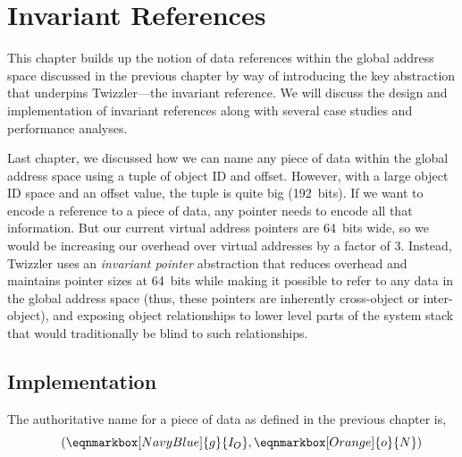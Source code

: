 
\chapter{Invariant References}\label{ch:invariant}


\begin{chabstract}
    This chapter builds up the notion of data references within the global address space discussed in the previous chapter by way of introducing the key abstraction that underpins
    Twizzler---the invariant reference. We will discuss the design and implementation of invariant references along with several case studies and performance analyses.
\end{chabstract}


Last chapter, we discussed how we can name any piece of data within the global address space using a tuple of object ID
and offset. However, with a large object ID space and an offset value, the tuple is quite big (192~bits). If we want to
encode a reference to a piece of data, any pointer needs to encode all that information. But our current virtual
address pointers are 64~bits wide, so we would be increasing our overhead over virtual addresses by a factor of 3.
Instead, Twizzler uses an \emph{invariant pointer} abstraction that reduces overhead and maintains pointer sizes at
64~bits while making it possible to refer to any data in the global address space (thus, these pointers are inherently
cross-object or inter-object), and exposing object relationships to lower level parts of the system stack that would
traditionally be blind to such relationships.

\section{Implementation}


The authoritative name for a piece of data as defined in the previous chapter is,
\begin{equation*}
    \,\,\,\,\,\,\,\,\,       \left(
    \eqnmarkbox[NavyBlue]{g}{I_O}
    , \eqnmarkbox[Orange]{o}{N}\right)
\end{equation*}

